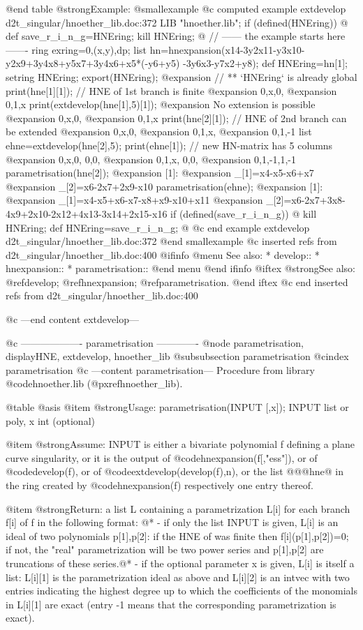 @end table
@strong{Example:}
@smallexample
@c computed example extdevelop d2t_singular/hnoether_lib.doc:372 
LIB "hnoether.lib";
if (defined(HNEring))
@{
def save_r_i_n_g=HNEring;
kill HNEring;
@}
// ------ the example starts here -------
ring exring=0,(x,y),dp;
list hn=hnexpansion(x14-3y2x11-y3x10-y2x9+3y4x8+y5x7+3y4x6+x5*(-y6+y5)
-3y6x3-y7x2+y8);
def HNEring=hn[1];
setring HNEring;  
export(HNEring);  
@expansion{} // ** `HNEring` is already global
print(hne[1][1]);    // HNE of 1st branch is finite
@expansion{} 0,x,0,
@expansion{} 0,1,x 
print(extdevelop(hne[1],5)[1]);
@expansion{}  No extension is possible
@expansion{} 0,x,0,
@expansion{} 0,1,x 
print(hne[2][1]);    // HNE of 2nd branch can be extended
@expansion{} 0,x,0,
@expansion{} 0,1,x,
@expansion{} 0,1,-1
list ehne=extdevelop(hne[2],5);
print(ehne[1]);      // new HN-matrix has 5 columns
@expansion{} 0,x,0, 0,0,
@expansion{} 0,1,x, 0,0,
@expansion{} 0,1,-1,1,-1
parametrisation(hne[2]);
@expansion{} [1]:
@expansion{}    _[1]=x4-x5-x6+x7
@expansion{}    _[2]=x6-2x7+2x9-x10
parametrisation(ehne);
@expansion{} [1]:
@expansion{}    _[1]=x4-x5+x6-x7-x8+x9-x10+x11
@expansion{}    _[2]=x6-2x7+3x8-4x9+2x10-2x12+4x13-3x14+2x15-x16
if (defined(save_r_i_n_g))
@{
kill HNEring;
def HNEring=save_r_i_n_g;
@}
@c end example extdevelop d2t_singular/hnoether_lib.doc:372
@end smallexample
@c inserted refs from d2t_singular/hnoether_lib.doc:400
@ifinfo
@menu
See also:
* develop::
* hnexpansion::
* parametrisation::
@end menu
@end ifinfo
@iftex
@strong{See also:}
@ref{develop};
@ref{hnexpansion};
@ref{parametrisation}.
@end iftex
@c end inserted refs from d2t_singular/hnoether_lib.doc:400

@c ---end content extdevelop---

@c ------------------- parametrisation -------------
@node parametrisation, displayHNE, extdevelop, hnoether_lib
@subsubsection parametrisation
@cindex parametrisation
@c ---content parametrisation---
Procedure from library @code{hnoether.lib} (@pxref{hnoether_lib}).

@table @asis
@item @strong{Usage:}
parametrisation(INPUT [,x]); INPUT list or poly, x int (optional)

@item @strong{Assume:}
INPUT is either a bivariate polynomial f defining a plane curve
singularity, or it is the output of @code{hnexpansion(f[,"ess"])},
or of @code{develop(f)}, or of @code{extdevelop(develop(f),n)},
or the list @@@{hne@} in the ring created by @code{hnexpansion(f)}
respectively one entry thereof.

@item @strong{Return:}
a list L containing a parametrization L[i] for each branch f[i] of f
in the following format: @*
- if only the list INPUT is given, L[i] is an ideal of two polynomials
p[1],p[2]: if the HNE of was finite then f[i](p[1],p[2])=0; if not,
the "real" parametrization will be two power series and p[1],p[2] are
truncations of these series.@*
- if the optional parameter x is given, L[i] is itself a list:
L[i][1] is the parametrization ideal as above and L[i][2] is an intvec
with two entries indicating the highest degree up to which the
coefficients of the monomials in L[i][1] are exact (entry -1 means that
the corresponding parametrization is exact).

